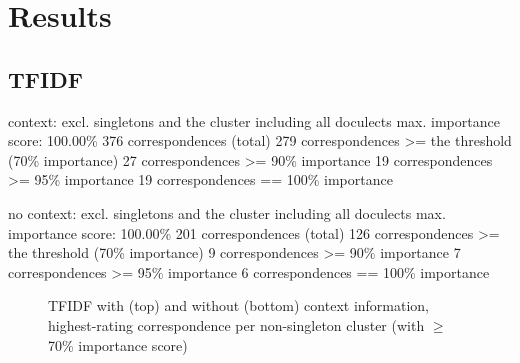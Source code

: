\documentclass[a4paper]{article}
\begin{document}
\newpage
\section{Results}

\subsection{TFIDF}

context:
excl. singletons and the cluster including all doculects
max. importance score: 100.00\%
376 correspondences (total)
279 correspondences >= the threshold (70\% importance)
27 correspondences >= 90\% importance
19 correspondences >= 95\% importance
19 correspondences == 100\% importance

no context:
excl. singletons and the cluster including all doculects
max. importance score: 100.00\%
201 correspondences (total)
126 correspondences >= the threshold (70\% importance)
9 correspondences >= 90\% importance
7 correspondences >= 95\% importance
6 correspondences == 100\% importance

\begin{figure}
    
    
    \caption{TFIDF with (top) and without (bottom) context information, highest-rating correspondence per non-singleton cluster (with $\geq$70\% importance score)}
    \label{fig:tfidf-dendrograms}
\end{figure}
\end{document}
